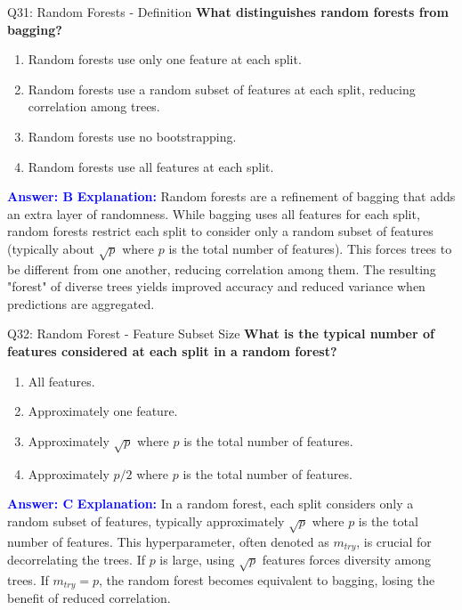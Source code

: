 \documentclass[8pt]{beamer}
\begin{document}
	\begin{frame}{Q31: Random Forests - Definition}
		\fontsize{6.5}{7.5}\selectfont
		\textbf{What distinguishes random forests from bagging?}
		\begin{enumerate}
			\item Random forests use only one feature at each split.
			\item Random forests use a random subset of features at each split, reducing correlation among trees.
			\item Random forests use no bootstrapping.
			\item Random forests use all features at each split.
		\end{enumerate}
		\vspace{0.1cm}
		\textcolor{blue}{\textbf{Answer: B}}
		\vspace{0.1cm}
		\textcolor{blue}{\textbf{Explanation:}} Random forests are a refinement of bagging that adds an extra layer of randomness. While bagging uses all features for each split, random forests restrict each split to consider only a random subset of features (typically about $\sqrt{p}$ where $p$ is the total number of features). This forces trees to be different from one another, reducing correlation among them. The resulting "forest" of diverse trees yields improved accuracy and reduced variance when predictions are aggregated.
	\end{frame}
	
	\begin{frame}{Q32: Random Forest - Feature Subset Size}
		\fontsize{6.5}{7.5}\selectfont
		\textbf{What is the typical number of features considered at each split in a random forest?}
		\begin{enumerate}
			\item All features.
			\item Approximately one feature.
			\item Approximately $\sqrt{p}$ where $p$ is the total number of features.
			\item Approximately $p/2$ where $p$ is the total number of features.
		\end{enumerate}
		\vspace{0.1cm}
		\textcolor{blue}{\textbf{Answer: C}}
		\vspace{0.1cm}
		\textcolor{blue}{\textbf{Explanation:}} In a random forest, each split considers only a random subset of features, typically approximately $\sqrt{p}$ where $p$ is the total number of features. This hyperparameter, often denoted as $m_{try}$, is crucial for decorrelating the trees. If $p$ is large, using $\sqrt{p}$ features forces diversity among trees. If $m_{try}=p$, the random forest becomes equivalent to bagging, losing the benefit of reduced correlation.
	\end{frame}
	
\end{document}

